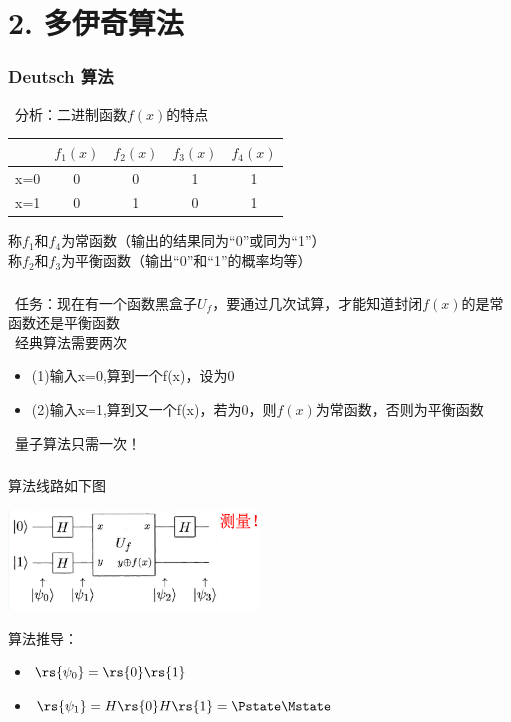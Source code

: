 \section{2. 多伊奇算法}
\begin{frame}
    \frametitle{Deutsch 算法}
    {\Bullet}~分析：二进制函数$f(x)$的特点
    \begin{table} 
    \begin{tabular}{ccccc}
        \toprule
         & $f_1(x)$ & $f_2(x)$ & $f_3(x)$ & $f_4(x)$ \\
        \midrule
        x=0 & 0 & 0 & 1 & 1\\
        x=1 & 0 & 1 & 0 & 1\\
        \bottomrule
      \end{tabular}
    \end{table}
    称$f_1$和$f_4$为常函数（输出的结果同为“0”或同为“1”）\\
    称$f_2$和$f_3$为平衡函数（输出“0”和“1”的概率均等） 
\end{frame}

\begin{frame}
    \frametitle{}
    {\Bullet}~任务：现在有一个函数黑盒子$U_f$，要通过几次试算，才能知道封闭$f(x)$的是常函数还是平衡函数 \\ \vspace{0.8em}
    {\Bullet}~经典算法需要两次
    \begin{itemize}
        \item (1)输入x=0,算到一个f(x)，设为0 
        \item (2)输入x=1,算到又一个f(x)，若为0，则$f(x)$为常函数，否则为平衡函数 
    \end{itemize}
    {\Bullet}~量子算法只需一次！
\end{frame}

\begin{frame}
    \frametitle{}
    算法线路如下图
    \begin{center}
        \includegraphics[width=0.5\textwidth]{figs/34.png}
    \end{center}
    算法推导：
    \begin{itemize}
        \item $\rs{\psi_0}=\rs{0}\rs{1}$
        \item $\rs{\psi_1}=H\rs{0}H\rs{1}=\Pstate\Mstate$
    \end{itemize}
\end{frame}

